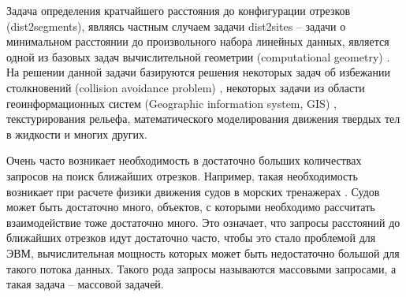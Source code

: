 
\startprefacepage

Задача определения кратчайшего расстояния до конфигурации отрезков
(dist2segments), являясь частным случаем задачи dist2sites -- задачи о
минимальном расстоянии до произвольного набора линейных данных,
является одной из базовых задач вычислительной геометрии (computational
geometry) \cite{PrSh}. На решении данной задачи базируются решения некоторых задач
об избежании столкновений (collision avoidance problem) \cite{MarNav}, некоторых задачи
из области геоинформационных систем (Geographic information system, GIS) \cite{CGinGIS},
текстурирования рельефа, математического моделирования движения твердых
тел в жидкости и многих других.

Очень часто возникает необходимость в достаточно
больших количествах запросов на поиск ближайших отрезков.
Например, такая необходимость возникает при расчете физики движения судов в морских
тренажерах \cite{MarNav}. Судов может быть достаточно много, объектов, с которыми
необходимо рассчитать взаимодействие тоже достаточно много. Это означает,
что запросы расстояний до ближайших отрезков идут достаточно часто, чтобы это стало проблемой
для ЭВМ, вычислительная мощность которых может быть недостаточно
большой для такого потока данных. Такого рода запросы называются
массовыми запросами, а такая задача -- массовой задачей.

